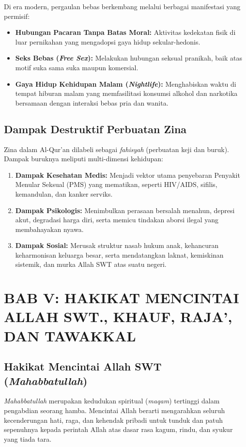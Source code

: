 \documentclass[12pt, a4paper]{article}
\begin{document}
Di era modern, pergaulan bebas berkembang melalui berbagai manifestasi yang permisif:
\begin{itemize}
    \item \textbf{Hubungan Pacaran Tanpa Batas Moral:} Aktivitas kedekatan fisik di luar pernikahan yang mengadopsi gaya hidup sekular-hedonis.
    \item \textbf{Seks Bebas (\textit{Free Sex}):} Melakukan hubungan seksual pranikah, baik atas motif suka sama suka maupun komersial.
    \item \textbf{Gaya Hidup Kehidupan Malam (\textit{Nightlife}):} Menghabiskan waktu di tempat hiburan malam yang memfasilitasi konsumsi alkohol dan narkotika bersamaan dengan interaksi bebas pria dan wanita.
\end{itemize}

\subsection{Dampak Destruktif Perbuatan Zina}
Zina dalam Al-Qur'an dilabeli sebagai \textit{fahisyah} (perbuatan keji dan buruk). Dampak buruknya meliputi multi-dimensi kehidupan:
\begin{enumerate}
    \item \textbf{Dampak Kesehatan Medis:} Menjadi vektor utama penyebaran Penyakit Menular Seksual (PMS) yang mematikan, seperti HIV/AIDS, sifilis, kemandulan, dan kanker serviks.
    \item \textbf{Dampak Psikologis:} Menimbulkan perasaan bersalah menahun, depresi akut, degradasi harga diri, serta memicu tindakan aborsi ilegal yang membahayakan nyawa.
    \item \textbf{Dampak Sosial:} Merusak struktur nasab hukum anak, kehancuran keharmonisan keluarga besar, serta mendatangkan laknat, kemiskinan sistemik, dan murka Allah SWT atas suatu negeri.
\end{enumerate}

\newpage

\section{BAB V: HAKIKAT MENCINTAI ALLAH SWT., KHAUF, RAJA', DAN TAWAKKAL}

\subsection{Hakikat Mencintai Allah SWT (\textit{Mahabbatullah})}
\textit{Mahabbatullah} merupakan kedudukan spiritual (\textit{maqam}) tertinggi dalam pengabdian seorang hamba. Mencintai Allah berarti mengarahkan seluruh kecenderungan hati, raga, dan kehendak pribadi untuk tunduk dan patuh sepenuhnya kepada perintah Allah atas dasar rasa kagum, rindu, dan syukur yang tiada tara.
\end{document}
